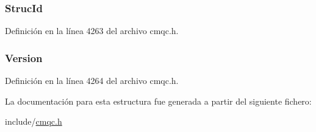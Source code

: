 \hypertarget{structtag_m_q_d_m_p_o_a0530922ca944569b52601d74941f96e4}{}
\subsubsection[{Struc\+Id}]{ Struc\+Id}\label{structtag_m_q_d_m_p_o_a0530922ca944569b52601d74941f96e4}


Definición en la línea 4263 del archivo cmqc.\+h.

\hypertarget{structtag_m_q_d_m_p_o_a0656ef8f766b3907d394d88a35d7b7e9}{}
\subsubsection[{Version}]{ Version}\label{structtag_m_q_d_m_p_o_a0656ef8f766b3907d394d88a35d7b7e9}


Definición en la línea 4264 del archivo cmqc.\+h.



La documentación para esta estructura fue generada a partir del siguiente fichero\+:\begin{DoxyCompactItemize}
\item 
include/\hyperlink{cmqc_8h}{cmqc.\+h}\end{DoxyCompactItemize}
